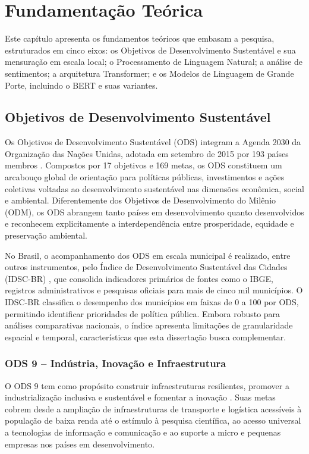 \chapter{Fundamentação Teórica}
\label{cap:fundamentacao-teorica}

Este capítulo apresenta os fundamentos teóricos que embasam a pesquisa, estruturados em
cinco eixos: os Objetivos de Desenvolvimento Sustentável e sua mensuração em escala local; o
Processamento de Linguagem Natural; a análise de sentimentos; a arquitetura Transformer; e os
Modelos de Linguagem de Grande Porte, incluindo o \gls{BERT} e suas variantes.

\section{Objetivos de Desenvolvimento Sustentável}
\label{sec:ods}

Os Objetivos de Desenvolvimento Sustentável (\gls{ODS}) integram a Agenda 2030 da
Organização das Nações Unidas, adotada em setembro de 2015 por 193 países membros
\cite{onu2015}. Compostos por 17 objetivos e 169 metas, os ODS constituem um arcabouço global
de orientação para políticas públicas, investimentos e ações coletivas voltadas ao desenvolvimento
sustentável nas dimensões econômica, social e ambiental. Diferentemente dos Objetivos de
Desenvolvimento do Milênio (ODM), os ODS abrangem tanto países em desenvolvimento quanto
desenvolvidos e reconhecem explicitamente a interdependência entre prosperidade, equidade e
preservação ambiental.

No Brasil, o acompanhamento dos ODS em escala municipal é realizado, entre outros
instrumentos, pelo Índice de Desenvolvimento Sustentável das Cidades (\gls{IDSC}-BR)
\cite{idsc2024}, que consolida indicadores primários de fontes como o IBGE, registros
administrativos e pesquisas oficiais para mais de cinco mil municípios. O IDSC-BR classifica o
desempenho dos municípios em faixas de 0 a 100 por ODS, permitindo identificar prioridades de
política pública. Embora robusto para análises comparativas nacionais, o índice apresenta
limitações de granularidade espacial e temporal, características que esta dissertação
busca complementar.

\subsection{ODS 9 -- Indústria, Inovação e Infraestrutura}
\label{subsec:ods9}

O ODS 9 tem como propósito construir infraestruturas resilientes, promover a
industrialização inclusiva e sustentável e fomentar a inovação \cite{onu2015}. Suas metas cobrem
desde a ampliação de infraestruturas de transporte e logística acessíveis à população de baixa
renda até o estímulo à pesquisa científica, ao acesso universal a tecnologias de informação e
comunicação e ao suporte a micro e pequenas empresas nos países em desenvolvimento.


